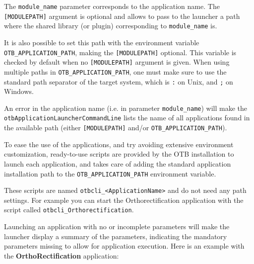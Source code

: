 The \verb?module_name? parameter corresponds to the application
name. The \verb?[MODULEPATH]? argument is optional and allows
to pass to the launcher a path where the shared library (or plugin)
corresponding to \verb?module_name? is.

It is also possible to set this path with the environment variable
\verb?OTB_APPLICATION_PATH?, making the \verb?[MODULEPATH]? optional.
This variable is checked by default when
no \verb?[MODULEPATH]? argument is given.
When using multiple paths in \verb?OTB_APPLICATION_PATH?, one must make sure to use
the standard path separator of the target system, which is \verb?:? on Unix, and \verb?;? on Windows.


An error in the application name (i.e. in parameter
\verb?module_name?) will make the
\verb?otbApplicationLauncherCommandLine? lists the name of all
applications found in the available path (either \verb?[MODULEPATH]?
and/or \verb?OTB_APPLICATION_PATH?).

To ease the use of the applications, and try avoiding extensive environment
customization, ready-to-use scripts are provided by the OTB installation
to launch each application, and takes care of adding the standard application
installation path to the \verb?OTB_APPLICATION_PATH? environment variable.

These scripts are named \verb?otbcli_<ApplicationName>? and do not need any path
settings. For example you can start the Orthorectification application
with the script called \verb?otbcli_Orthorectification?.


Launching an application with no or incomplete parameters will make the
launcher display a summary of the parameters, indicating the mandatory parameters
missing to allow for application execution. Here is an example
with the \textbf{OrthoRectification} application:

